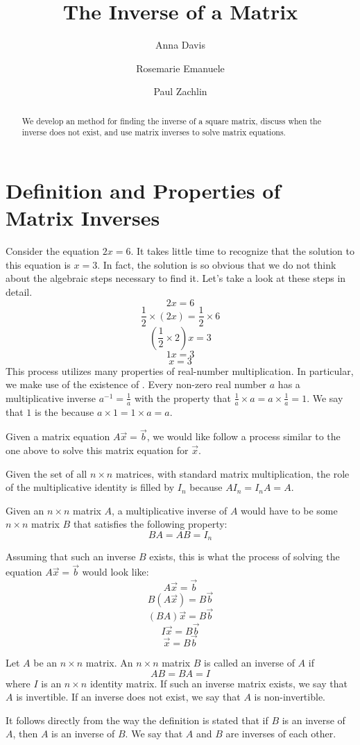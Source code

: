 \documentclass{ximera}
\author{Anna Davis \and Rosemarie Emanuele \and Paul Zachlin} \title{The Inverse of a Matrix} \license{CC-BY 4.0}
\begin{document}
\begin{abstract}
 We develop an method for finding the inverse of a square matrix, discuss when the inverse does not exist, and use matrix inverses to solve matrix equations.
\end{abstract}
\maketitle

\section*{Definition and Properties of Matrix Inverses}
Consider the equation $2x=6$.  It takes little time to recognize that the solution to this equation is $x=3$.  In fact, the solution is so obvious that we do not think about the algebraic steps necessary to find it.  Let's take a look at these steps in detail.
$$2x=6$$
$$\frac{1}{2}\times (2x)=\frac{1}{2}\times 6$$
$$(\frac{1}{2}\times 2)x=3$$
$$1x=3$$
$$x=3$$
This process utilizes many properties of real-number multiplication.  In particular, we make use of the existence of .  Every non-zero real number $a$  has a multiplicative inverse $a^{-1}=\frac{1}{a}$ with the property that $\frac{1}{a}\times a=a\times \frac{1}{a}=1$.  We say that $1$ is the  because $a\times 1=1\times a=a$.

Given a matrix equation $A\vec{x}=\vec{b}$, we would like follow a process similar to the one above to solve this matrix equation for $\vec{x}$.  

Given the set of all $n\times n$ matrices, with standard matrix multiplication, the role of the multiplicative identity is filled by $I_n$ because $AI_n=I_nA=A$. 

Given an $n\times n$ matrix $A$, a multiplicative inverse of $A$ would have to be some $n\times n$ matrix $B$ that satisfies the following property:
$$BA=AB=I_n$$

Assuming that such an inverse $B$ exists, this is what the process of solving the equation $A\vec{x}=\vec{b}$ would look like:
$$A\vec{x}=\vec{b}$$
$$B(A\vec{x})=B\vec{b}$$
$$(BA)\vec{x}=B\vec{b}$$
$$I\vec{x}=B\vec{b}$$
$$\vec{x}=B\vec{b}$$

\begin{definition}\label{def:matinverse}
Let $A$ be an $n\times n$ matrix.  An $n\times n$ matrix $B$ is called an inverse of $A$ if 
$$AB=BA=I$$
where $I$ is an $n\times n$ identity matrix.  If such an inverse matrix exists, we say that $A$ is invertible.  If an inverse does not exist, we say that $A$ is non-invertible.
\end{definition}
It follows directly from the way the definition is stated that if $B$ is an inverse of $A$, then $A$ is an inverse of $B$. We say that $A$ and $B$ are inverses of each other.
\end{document}
